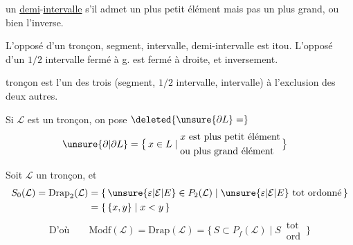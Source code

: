 un \uline{demi}-\uline{intervalle} s'il admet un plus petit élément mais pas un plus grand, ou bien l'inverse.

 L'opposé d'un tronçon, segment, intervalle, demi-intervalle est itou. L'opposé d'un $1/2$ intervalle fermé à g. est fermé à droite, et inversement.

 tronçon est l'un des trois (segment, $1/2$ intervalle, intervalle) à l'exclusion des deux autres.

Si $\mathcal L$ est un tronçon, on pose $\deleted{\unsure{\partial L}=}$
\[
\begin{aligned}
\unsure{\partial|\partial L}&=\bigl\{\,x\in L\mid
\begin{aligned}&x\text{ est plus petit élément}\\
&\text{ou plus grand élément}\end{aligned}\,\bigr\}
\end{aligned}
\]

Soit $\mathcal L$ un tronçon, et
\[
\begin{aligned}
S_0(\mathcal L)=\mathrm{Drap}_2(\mathcal L)&=\{\,\unsure{\varepsilon|\mathcal E|E}\in P_2(\mathcal L)\mid \unsure{\varepsilon|\mathcal E|E}\text{ tot ordonné}\,\}\\
&=\{\,\{x,y\}\mid x<y\,\}
\end{aligned}
\]
\[
\text{D'où}\qquad \mathrm{Modf}(\mathcal L)=\mathrm{Drap}(\mathcal L)
=\{\,S\subset P_f(\mathcal L)\mid S\,\substack{\text{tot}\\\text{ord}}\,\}
\]

